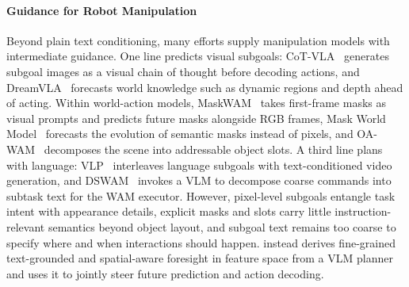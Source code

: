 \paragraph{Guidance for Robot Manipulation}
Beyond plain text conditioning, many efforts supply manipulation models with intermediate guidance.
One line predicts visual subgoals: CoT-VLA~\cite{zhao2025cot} generates subgoal images as a visual chain of thought before decoding actions, and DreamVLA~\cite{zhangdreamvla} forecasts world knowledge such as dynamic regions and depth ahead of acting.
Within world-action models, MaskWAM~\cite{maskwam} takes first-frame masks as visual prompts and predicts future masks alongside RGB frames, Mask World Model~\cite{maskwm} forecasts the evolution of semantic masks instead of pixels, and OA-WAM~\cite{oawam} decomposes the scene into addressable object slots.
A third line plans with language: VLP~\cite{vlp} interleaves language subgoals with text-conditioned video generation, and DSWAM~\cite{dswam} invokes a VLM to decompose coarse commands into subtask text for the WAM executor.
However, pixel-level subgoals entangle task intent with appearance details, explicit masks and slots carry little instruction-relevant semantics beyond object layout, and subgoal text remains too coarse to specify where and when interactions should happen.
\ourmethod instead derives fine-grained text-grounded and spatial-aware foresight in feature space from a VLM planner and uses it to jointly steer future prediction and action decoding.
